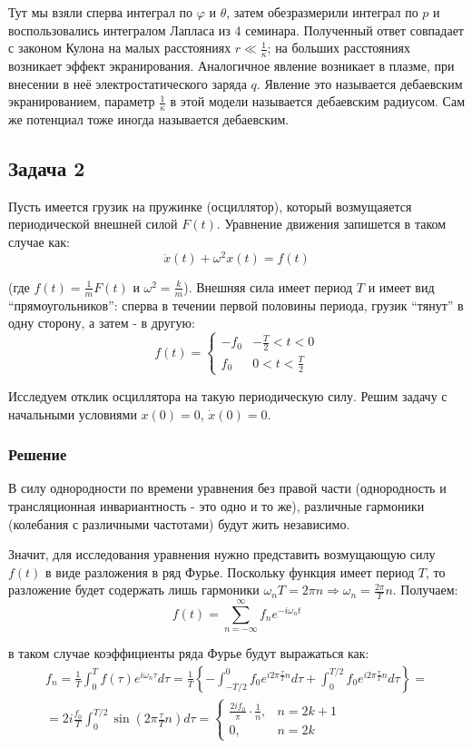 \documentclass[a4paper,12pt]{article}
\begin{document}
\noindent
Тут мы взяли сперва интеграл по $\varphi$ и $\theta$, затем обезразмерили
интеграл по $p$ и воспользовались интегралом Лапласа из 4 семинара.
Полученный ответ совпадает с законом Кулона на малых расстояниях $r\ll\frac{1}{\kappa}$;
на больших расстояниях возникает эффект экранирования. Аналогичное
явление возникает в плазме, при внесении в неё электростатического
заряда $q$. Явление это называется дебаевским экранированием, параметр
$\frac{1}{\kappa}$ в этой модели называется дебаевским радиусом.
Сам же потенциал тоже иногда называется дебаевским.


\subsection*{Задача 2}

Пусть имеется грузик на пружинке (осциллятор), который возмущаяется
периодической внешней силой $F(t)$. Уравнение движения запишется
в таком случае как:
\[
\ddot{x}(t)+\omega^{2}x(t)=f(t)
\]


\noindent
(где $f(t)=\frac{1}{m}F(t)$ и $\omega^{2}=\frac{k}{m}$). Внешняя
сила имеет период $T$ и имеет вид ``прямоугольников'': сперва в
течении первой половины периода, грузик ``тянут'' в одну сторону,
а затем - в другую:
\[
f(t)=\begin{cases}
-f_{0} & -\frac{T}{2}<t<0\\
f_{0} & 0<t<\frac{T}{2}
\end{cases}
\]


\noindent
Исследуем отклик осциллятора на такую периодическую силу. Решим задачу
с начальными условиями $x\left(0\right)=0$, $\dot{x}(0)=0$.


\subsubsection*{Решение}

В силу однородности по времени уравнения без правой части (однородность
и трансляционная инвариантность - это одно и то же), различные гармоники
(колебания с различными частотами) будут жить независимо.

\noindent
Значит, для исследования уравнения нужно представить возмущающую силу
$f\left(t\right)$ в виде разложения в ряд Фурье. Поскольку функция
имеет период $T$, то разложение будет содержать лишь гармоники $\omega_{n}T=2\pi n\Rightarrow\omega_{n}=\frac{2\pi}{T}n$.
Получаем:
\[
f(t)=\sum_{n=-\infty}^{\infty}f_{n}e^{-i\omega_{n}t}
\]


\noindent
в таком случае коэффициенты ряда Фурье будут выражаться как:
\begin{multline*}
f_{n}=\frac{1}{T}\int_{0}^{T}f\left(\tau\right)e^{i\omega_{n}\tau}d\tau=\frac{1}{T}\left\{ -\int_{-T/2}^{0}f_{0}e^{i2\pi\frac{\tau}{T}n}d\tau+\int_{0}^{T/2}f_{0}e^{i2\pi\frac{\tau}{T}n}d\tau\right\} =\\
=2i\frac{f_{0}}{T}\int_{0}^{T/2}\sin\left(2\pi\frac{\tau}{T}n\right)d\tau=\begin{cases}
\frac{2if_{0}}{\pi}\cdot\frac{1}{n}, & n=2k+1\\
0, & n=2k
\end{cases}
\end{multline*}
\end{document}
